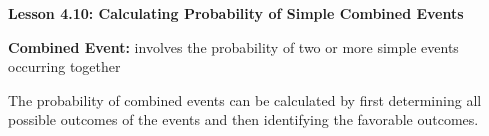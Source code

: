  \begin{center}
\textbf{Lesson 4.10: Calculating Probability of Simple Combined Events}
\end{center}

\vspace*{-1.5ex}

\textbf{Combined Event:} involves the probability of two or more simple events occurring together

The probability of combined events can be calculated by first determining all possible outcomes of the events and then identifying the favorable outcomes.

